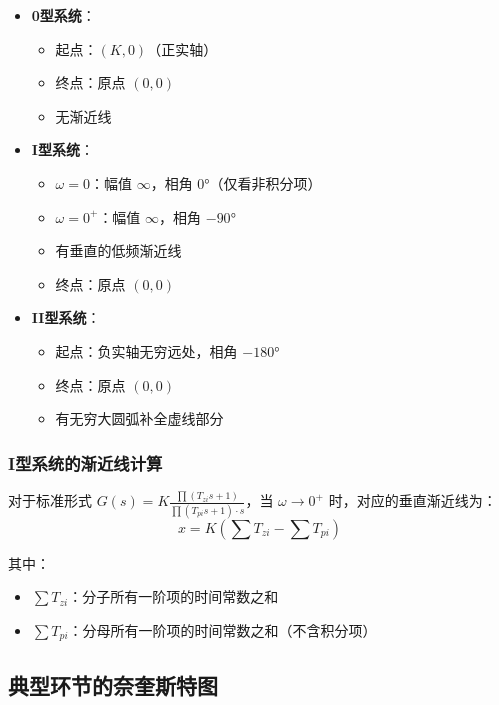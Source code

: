 \begin{itemize}
    \item \textbf{0型系统}：
    \begin{itemize}
        \item 起点：$(K, 0)$（正实轴）
        \item 终点：原点 $(0, 0)$
        \item 无渐近线
    \end{itemize}
    
    \item \textbf{I型系统}：
    \begin{itemize}
        \item $\omega = 0$：幅值 $\infty$，相角 $0°$（仅看非积分项）
        \item $\omega = 0^+$：幅值 $\infty$，相角 $-90°$
        \item 有垂直的低频渐近线
        \item 终点：原点 $(0, 0)$
    \end{itemize}
    
    \item \textbf{II型系统}：
    \begin{itemize}
        \item 起点：负实轴无穷远处，相角 $-180°$
        \item 终点：原点 $(0, 0)$
        \item 有无穷大圆弧补全虚线部分
    \end{itemize}
\end{itemize}

\subsubsection{I型系统的渐近线计算}

对于标准形式 $G(s) = K \frac{\prod(T_{zi}s+1)}{\prod(T_{pi}s+1) \cdot s}$，当 $\omega \to 0^+$ 时，对应的垂直渐近线为：
$$x = K\left(\sum T_{zi} - \sum T_{pi}\right)$$

其中：
\begin{itemize}
    \item $\sum T_{zi}$：分子所有一阶项的时间常数之和
    \item $\sum T_{pi}$：分母所有一阶项的时间常数之和（不含积分项）
\end{itemize}

\subsection{典型环节的奈奎斯特图}

